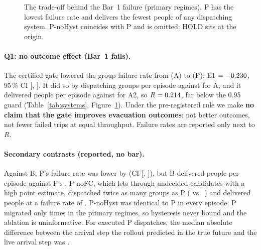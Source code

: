 \documentclass[letterpaper]{article}
\begin{document}
\begin{table}[t]
\centering\small
\setlength{\tabcolsep}{3pt}
\resizebox{\columnwidth}{!}{}
\caption{Means per episode over the two primary regimes (120 episodes per system): dispatched groups,
people safely arrived, and the per-episode group failure rate averaged over episodes. Systems are
defined in the Pre-Registered Evaluation section. Per-regime numbers, including the stress regime,
are in Appendix Table~\ref{tab:regimes}.}
\label{tab:systems}
\end{table}

\begin{figure}[t]
\centering

\caption{The trade-off behind the Bar~1 failure (primary regimes). P has the lowest failure rate and
delivers the fewest people of any dispatching system. P-noHyst coincides with P and is omitted; HOLD sits
at the origin.}
\label{fig:tradeoff}
\end{figure}

\paragraph{Q1: no outcome effect (Bar~1 fails).} The certified gate lowered the group failure rate from
\nRateA{} (A) to \nRateP{} (P); E1 $=-0.230$, 95\,\% CI [\nEOneLo, \nEOneHi]. It did so by
dispatching \nGroupsP{} groups per episode against \nGroupsA{} for A, and it delivered \nSafeP{} people
per episode against \nSafeAtwo{} for A2, so $R=0.214$, far below the 0.95 guard (Table~\ref{tab:systems},
Figure~\ref{fig:tradeoff}). Under the pre-registered rule we make \textbf{no claim that the gate improves
evacuation outcomes}: not better outcomes, not fewer failed trips at equal throughput. Failure rates are
reported only next to $R$.

\paragraph{Secondary contrasts (reported, no bar).} Against B, P's failure rate was lower by
\nPvBDiff{} (CI [\nPvBLo, \nPvBHi]), but B delivered \nSafeB{} people per episode against P's \nSafeP.
P-noFC, which lets through undecided candidates with a high point estimate, dispatched twice as many
groups as P (\nGroupsPnoFC{} vs.\ \nGroupsP) and delivered \nSafePnoFC{} people at a failure rate of
\nFailPnoFC. P-noHyst was identical to P in every episode: P migrated only \nMigrationsP{} times in the
primary regimes, so hysteresis never bound and the ablation is uninformative. For executed P
dispatches, the median absolute difference between the arrival step the rollout predicted in the true
future and the live arrival step was \nArrErrP.
\end{document}
